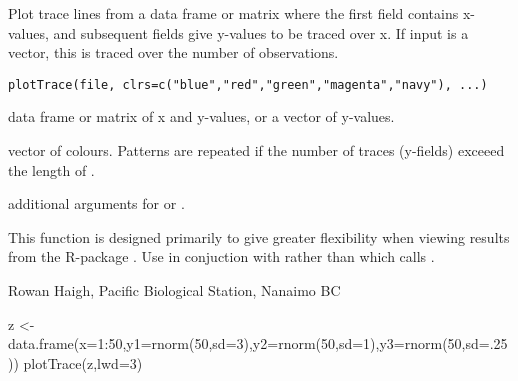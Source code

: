 \documentclass[letterpaper]{book}
\begin{document}
\begin{Description}\relax
Plot trace lines from a data frame or matrix where the first field contains x-values, 
and subsequent fields give y-values to be traced over x. If input is a vector, 
this is traced over the number of observations.
\end{Description}
\begin{Usage}
\begin{verbatim}
plotTrace(file, clrs=c("blue","red","green","magenta","navy"), ...)
\end{verbatim}
\end{Usage}
\begin{Arguments}
\begin{ldescription}
\item[\code{file}] data frame or matrix of x and y-values, or a vector of y-values.
\item[\code{clrs}] vector of colours. Patterns are repeated if the number 
of traces (y-fields) exceeed the length of .
\item[\code{...}] additional arguments for  or .
\end{ldescription}
\end{Arguments}
\begin{Details}\relax
This function is designed primarily to give greater flexibility when viewing 
results from the R-package . Use  in conjuction with 
 rather than  
which calls .
\end{Details}
\begin{Author}\relax
Rowan Haigh, Pacific Biological Station, Nanaimo BC
\end{Author}
\begin{Examples}
\begin{ExampleCode}
z <- data.frame(x=1:50,y1=rnorm(50,sd=3),y2=rnorm(50,sd=1),y3=rnorm(50,sd=.25))
plotTrace(z,lwd=3)
\end{ExampleCode}
\end{Examples}
\end{document}
